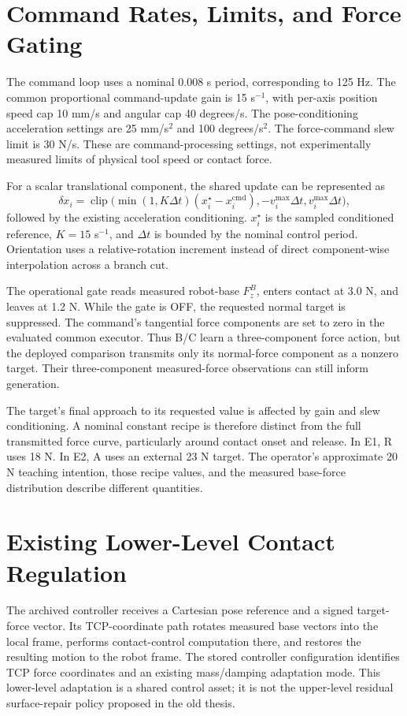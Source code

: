\section{Command Rates, Limits, and Force Gating}
The command loop uses a nominal 0.008 s period, corresponding to 125 Hz. The common proportional command-update gain is 15 s\(^{-1}\), with per-axis position speed cap 10 mm/s and angular cap 40 degrees/s. The pose-conditioning acceleration settings are 25 mm/s\(^2\) and 100 degrees/s\(^2\). The force-command slew limit is 30 N/s. These are command-processing settings, not experimentally measured limits of physical tool speed or contact force.

For a scalar translational component, the shared update can be represented as
\begin{equation}
 \delta x_i=\operatorname{clip}\bigl(\min(1,K\Delta t)(x_i^\star-x_i^{\mathrm{cmd}}),
                    -v_i^{\max}\Delta t,v_i^{\max}\Delta t\bigr),
 \label{eq:command_update}
\end{equation}
followed by the existing acceleration conditioning. \(x_i^\star\) is the sampled conditioned reference, \(K=15\) s\(^{-1}\), and \(\Delta t\) is bounded by the nominal control period. Orientation uses a relative-rotation increment instead of direct component-wise interpolation across a branch cut.

The operational gate reads measured robot-base \(F_z^B\), enters contact at 3.0 N, and leaves at 1.2 N. While the gate is OFF, the requested normal target is suppressed. The command's tangential force components are set to zero in the evaluated common executor. Thus B/C learn a three-component force action, but the deployed comparison transmits only its normal-force component as a nonzero target. Their three-component measured-force observations can still inform generation.

The target's final approach to its requested value is affected by gain and slew conditioning. A nominal constant recipe is therefore distinct from the full transmitted force curve, particularly around contact onset and release. In E1, R uses 18 N. In E2, A uses an external 23 N target. The operator's approximate 20 N teaching intention, those recipe values, and the measured base-force distribution describe different quantities.

\section{Existing Lower-Level Contact Regulation}
The archived controller receives a Cartesian pose reference and a signed target-force vector. Its TCP-coordinate path rotates measured base vectors into the local frame, performs contact-control computation there, and restores the resulting motion to the robot frame. The stored controller configuration identifies TCP force coordinates and an existing mass/damping adaptation mode. This lower-level adaptation is a shared control asset; it is not the upper-level residual surface-repair policy proposed in the old thesis.

